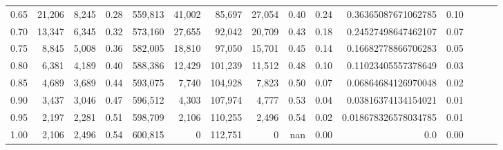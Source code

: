\begin{tabular}{rrrrrrrrrrrrrrr}
0.65 &  21,206 &   8,245 &  0.28 &  559,813 &   41,002 &   85,697 &   27,054 &  0.40 &  0.24 &   0.36365087671062785 &      0.10 \\
0.70 &  13,347 &   6,345 &  0.32 &  573,160 &   27,655 &   92,042 &   20,709 &  0.43 &  0.18 &   0.24527498647462107 &      0.07 \\
0.75 &   8,845 &   5,008 &  0.36 &  582,005 &   18,810 &   97,050 &   15,701 &  0.45 &  0.14 &   0.16682778866706283 &      0.05 \\
0.80 &   6,381 &   4,189 &  0.40 &  588,386 &   12,429 &  101,239 &   11,512 &  0.48 &  0.10 &   0.11023405557378649 &      0.03 \\
0.85 &   4,689 &   3,689 &  0.44 &  593,075 &    7,740 &  104,928 &    7,823 &  0.50 &  0.07 &   0.06864684126970048 &      0.02 \\
0.90 &   3,437 &   3,046 &  0.47 &  596,512 &    4,303 &  107,974 &    4,777 &  0.53 &  0.04 &   0.03816374134154021 &      0.01 \\
0.95 &   2,197 &   2,281 &  0.51 &  598,709 &    2,106 &  110,255 &    2,496 &  0.54 &  0.02 &  0.018678326578034785 &      0.01 \\
1.00 &   2,106 &   2,496 &  0.54 &  600,815 &        0 &  112,751 &        0 &   nan &  0.00 &                   0.0 &      0.00 \\
\bottomrule
\end{tabular}
